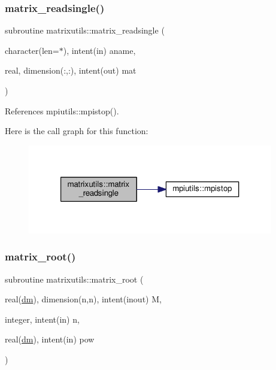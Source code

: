 \mbox{\label{namespacematrixutils_a6c4f5774cfa213609562eb2a5dfeca92}} 
\subsubsection{\texorpdfstring{matrix\+\_\+readsingle()}{matrix\_readsingle()}}
{\footnotesize\ttfamily subroutine matrixutils\+::matrix\+\_\+readsingle (\begin{DoxyParamCaption}\item[{character(len=$\ast$), intent(in)}]{aname,  }\item[{real, dimension(\+:,\+:), intent(out)}]{mat }\end{DoxyParamCaption})}



References mpiutils\+::mpistop().

Here is the call graph for this function\+:
\nopagebreak
\begin{figure}[H]
\begin{center}
\leavevmode
\includegraphics[width=304pt]{namespacematrixutils_a6c4f5774cfa213609562eb2a5dfeca92_cgraph}
\end{center}
\end{figure}
\mbox{\label{namespacematrixutils_a76928f01b83f388ddb51ee3e256cd3a5}} 
\subsubsection{\texorpdfstring{matrix\+\_\+root()}{matrix\_root()}}
{\footnotesize\ttfamily subroutine matrixutils\+::matrix\+\_\+root (\begin{DoxyParamCaption}\item[{real(\mbox{\hyperlink{namespacematrixutils_a7bdc564986ea4d90f51201c75606ef3d}{dm}}), dimension(n,n), intent(inout)}]{M,  }\item[{integer, intent(in)}]{n,  }\item[{real(\mbox{\hyperlink{namespacematrixutils_a7bdc564986ea4d90f51201c75606ef3d}{dm}}), intent(in)}]{pow }\end{DoxyParamCaption})}



